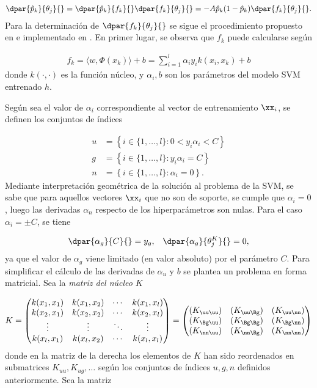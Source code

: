 \begin{align}
  \dpar{\hat{p}_k}{\theta_j}{} =
  \dpar{\hat{p}_k}{f_k}{}\dpar{f_k}{\theta_j}{} =
  -A\hat{p}_k(1-\hat{p}_k)\dpar{f_k}{\theta_j}{}.
  \label{eq:deriv-pk-thetak}
\end{align}
Para la determinación de $\dpar{f_k}{\theta_j}{}$ se sigue el
procedimiento propuesto en \cite{keerthi,glasmachers} e implementado
en \cite{shark}.
En primer lugar, se observa que $f_k$ puede calcularse según

\begin{align}
  f_k = \langle w,\Phi(x_k)\rangle+b = \sum_{i=1}^l \alpha_i y_i k(x_i,x_k) + b
  \label{fk}
\end{align}
donde $k(\cdot,\cdot)$ es la función núcleo, y $\alpha_i, b$ son los
parámetros del modelo SVM entrenado $h$.

Según sea el valor de $\alpha_i$ correspondiente al vector de
entrenamiento $\xx_i$, se definen los conjuntos de índices

\begin{align}
  \label{unbounded-sv-set}
  u &= \left\{i\in\{1,\ldots,l\}:0<y_i\alpha_i<C \right\}\\
  \label{bounded-sv-set}
  g &= \left\{i\in\{1,\ldots,l\}: y_i\alpha_i=C \right\}\\
  n &= \left\{i\in\{1,\ldots,l\}: \alpha_i=0 \right\}.
\end{align}
Mediante interpretación geométrica de la solución al problema de la
SVM, se sabe que para aquellos vectores $\xx_i$ que no son de soporte,
se cumple que $\alpha_i=0$, luego las derivadas $\alpha_n$ respecto de los
hiperparámetros son nulas. Para el caso $\alpha_i=\pm{}C$, se tiene

\begin{align}
  \dpar{\alpha_g}{C}{} = y_g, && \dpar{\alpha_g}{{\theta}^K_j}{} = 0,
\end{align}
ya que el valor de $\alpha_g$ viene limitado (en valor absoluto) por el
parámetro $C$. Para simplificar el cálculo de las derivadas de
$\alpha_u$ y $b$ se plantea un problema en forma matricial. Sea la
\emph{matriz del núcleo} $K$

\begin{align}
  K = \begin{pmatrix} k(x_1,x_1) & k(x_1,x_2) & \cdots & k(x_1,x_l)
    \\ k(x_2,x_1) & k(x_2,x_2) & \cdots & k(x_2,x_l) \\ \vdots &
    \vdots & \ddots & \vdots \\ k(x_l,x_1) & k(x_l,x_2) & \cdots &
    k(x_l,x_l)
  \end{pmatrix}
  =
  \begin{pmatrix}
    (K_{\uu\uu}) & (K_{\uu\Bg}) & (K_{\uu\nn}) \\
    (K_{\Bg\uu}) & (K_{\Bg\Bg}) & (K_{\Bg\nn}) \\
    (K_{\nn\uu}) & (K_{\nn\Bg}) & (K_{\nn\nn})
  \end{pmatrix}
\end{align}
donde en la matriz de la derecha los elementos de $K$ han sido
reordenados en submatrices $K_{uu},K_{ug},\ldots$ según los conjuntos
de índices $u, g, n$ definidos anteriormente.  Sea la matriz

